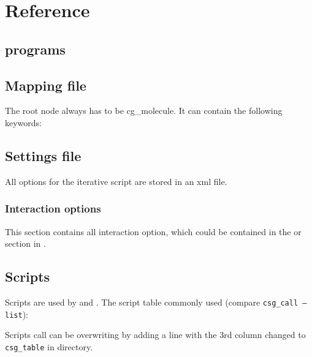 \chapter{Reference}
\section{programs}

\section{Mapping file}
\label{sec:ref_mapping}
The root node always has to be cg\_molecule. It can contain the following keywords:



\section{Settings file}
All options for the iterative script are stored in an xml file.
\label{sec:ref_options}


\subsection{Interaction options}
\label{sec:ref_interaction}
This section contains all interaction option, which could be contained in the  or  section in .

\vfill

\section{Scripts}
\label{sec:csg_table}
Scripts are used by  and .
The script table commonly used (compare \texttt{csg\_call --list}): 

Scripts call can be overwriting by adding a line with the 3rd column changed to \texttt{csg\_table} in  directory.

